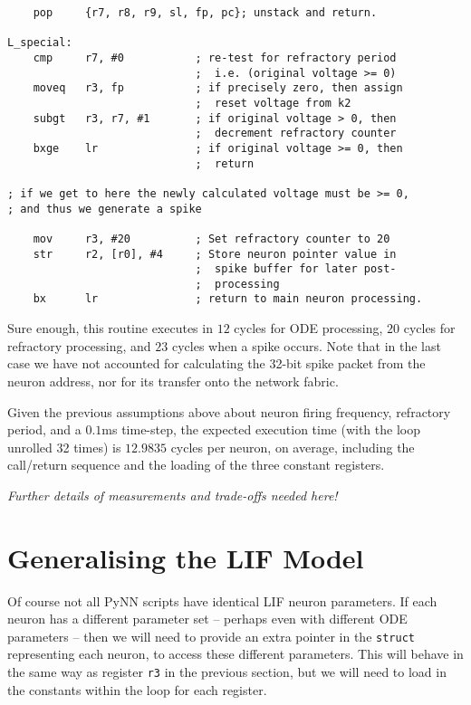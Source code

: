 \begin{verbatim}
    pop     {r7, r8, r9, sl, fp, pc}; unstack and return.

L_special:
    cmp     r7, #0           ; re-test for refractory period
                             ;  i.e. (original voltage >= 0)
    moveq   r3, fp           ; if precisely zero, then assign
                             ;  reset voltage from k2
    subgt   r3, r7, #1       ; if original voltage > 0, then
                             ;  decrement refractory counter
    bxge    lr               ; if original voltage >= 0, then
                             ;  return

; if we get to here the newly calculated voltage must be >= 0,
; and thus we generate a spike

    mov     r3, #20          ; Set refractory counter to 20
    str     r2, [r0], #4     ; Store neuron pointer value in
                             ;  spike buffer for later post-
                             ;  processing
    bx      lr               ; return to main neuron processing.
\end{verbatim}
Sure enough, this routine executes in $12$ cycles for ODE processing,
$20$ cycles for refractory processing, and $23$ cycles when a spike
occurs. Note that in the last case we have not accounted for
calculating the 32-bit spike packet from the neuron address, nor for
its transfer onto the network fabric.

Given the previous assumptions above about neuron firing frequency, refractory
period, and a $0.1$ms time-step, the expected execution time (with the
loop unrolled 32 times) is $12.9835$ cycles per neuron, on average,
including the call/return sequence and the loading of the three
constant registers.

{\em Further details of measurements and trade-offs needed here!}

\section{Generalising the LIF Model}

Of course not all PyNN scripts have identical LIF neuron
parameters. If each neuron has a different parameter set -- perhaps
even with different ODE parameters -- then we will need to provide an
extra pointer in the {\tt struct} representing each neuron, to access
these different parameters. This will behave in the same way as
register  {\tt r3} in the previous section, but we will need to load
in the constants within the loop for each register.

